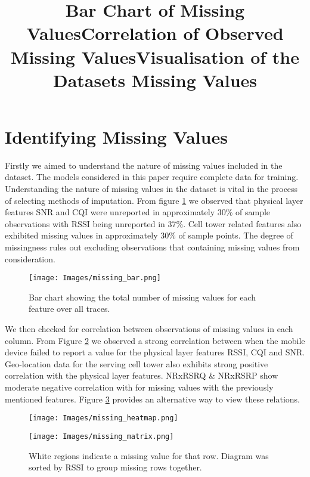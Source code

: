 \section{Identifying Missing Values}
\label{sec:missingness}
Firstly we aimed to understand the nature of missing values included in the dataset. The models considered in this paper require complete data for training. Understanding the nature of missing values in the dataset is vital in the process of selecting methods of imputation\cite{DONDERS20061087}. From figure \ref{fig:missing_bar} we observed that physical layer features SNR and CQI were unreported in approximately 30\% of sample observations with RSSI being unreported in 37\%. Cell tower related features also exhibited missing values in approximately 30\% of sample points. The degree of missingness  rules out excluding observations that containing missing values from consideration.

\begin{figure}[h]
\texttt{[image: Images/missing\_bar.png]}
\centering
\title{Bar Chart of Missing Values}
\caption{Bar chart showing the total number of missing values for each feature over all traces.}
\label{fig:missing_bar}
\end{figure}

We then checked for correlation between observations of missing values in each column. From Figure \ref{fig:missing_heatmap} we observed a strong correlation between when the mobile device failed to report a value for the physical layer features RSSI, CQI and SNR. Geo-location data for the serving cell tower also exhibits strong positive correlation with the physical layer features. NRxRSRQ \& NRxRSRP show moderate negative correlation with for missing values with the previously mentioned features. Figure \ref{fig:missing_matrix} provides an alternative way to view these relations.

\begin{figure}[h]
\texttt{[image: Images/missing\_heatmap.png]}
\centering
\title{Correlation of Observed Missing Values}
\caption{}
\label{fig:missing_heatmap}
\end{figure}


\begin{figure}[h]
\texttt{[image: Images/missing\_matrix.png]}
\centering
\title{Visualisation of the Datasets Missing Values}
\caption{White regions indicate a missing value for that row. Diagram was sorted by RSSI to group missing rows together.}
\label{fig:missing_matrix}
\end{figure}

